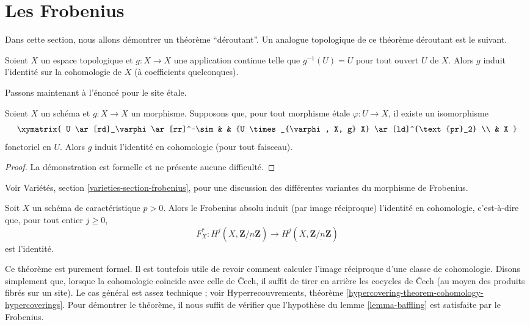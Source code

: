 \section{Les Frobenius}
\label{section-frobenii}

\noindent
Dans cette section, nous allons démontrer un théorème ``déroutant''.
Un analogue topologique de ce théorème déroutant est le suivant.

\begin{exercise}
\label{exercise-baffling}
Soient $X$ un espace topologique et $g : X \to X$ une application continue telle
que $g^{-1}(U) = U$ pour tout ouvert $U$ de $X$. Alors $g$ induit l'identité sur
la cohomologie de $X$ (à coefficients quelconques).
\end{exercise}

\noindent
Passons maintenant à l'énoncé pour le site \'etale.

\begin{lemma}
\label{lemma-baffling}
Soient $X$ un schéma et $g : X \to X$ un morphisme. Supposons que, pour tout
morphisme \'etale $\varphi : U \to X$, il existe un isomorphisme
$$
\xymatrix{
U \ar[rd]_\varphi \ar[rr]^-\sim & & {U
\times_{\varphi, X, g} X} \ar[ld]^{\text{pr}_2} \\
& X
}
$$
fonctoriel en $U$. Alors $g$ induit l'identité en cohomologie (pour tout faisceau).
\end{lemma}

\begin{proof}
La démonstration est formelle et ne présente aucune difficulté.
\end{proof}

\noindent
Voir Variétés, section \ref{varieties-section-frobenius},
pour une discussion des différentes variantes du morphisme de Frobenius.

\begin{theorem}
\label{theorem-baffling}
Soit $X$ un schéma de caractéristique $p > 0$. Alors le Frobenius absolu
induit (par image réciproque) l'identité en cohomologie, c'est-à-dire que, pour
tout entier $j\geq 0$,
$$
F_X^* : H^j (X, \underline{\mathbf{Z}/n\mathbf{Z}}) \longrightarrow H^j (X,
\underline{\mathbf{Z}/n\mathbf{Z}})
$$
est l'identité.
\end{theorem}

\noindent
Ce théorème est purement formel. Il est toutefois utile de revoir comment
calculer l'image réciproque d'une classe de cohomologie. Disons simplement que,
lorsque la cohomologie coïncide avec celle de {\v C}ech, il suffit de tirer en
arrière les cocycles de {\v C}ech (au moyen des produits fibrés sur un site). Le
cas général est assez technique ; voir
Hyperrecouvrements, théorème \ref{hypercovering-theorem-cohomology-hypercoverings}.
Pour démontrer le théorème, il nous suffit
de vérifier que l'hypothèse du lemme \ref{lemma-baffling}
est satisfaite par le Frobenius.

